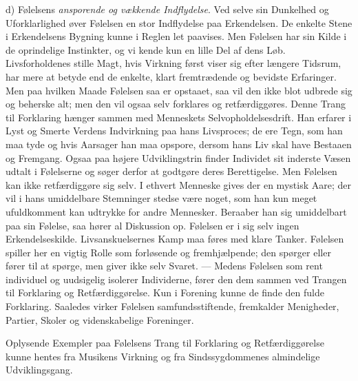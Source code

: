 \documentclass[12pt,a4paper,openany]{book}
\newcommand{\opage}[1]{\marginnote{\footnotesize\textit{[#1]}}}
\begin{document}
d) Følelsens \emph{ansporende og vækkende Indflydelse}. Ved selve sin
Dunkelhed og Uforklarlighed øver Følelsen en stor Indflydelse paa
Erkendelsen. De enkelte Stene i Erkendelsens Bygning kunne i Reglen let
paavises. Men Følelsen har sin Kilde i de oprindelige Instinkter, og vi
kende kun en lille Del af dens Løb. Livsforholdenes stille Magt, hvis
Virkning først viser sig efter længere Tidsrum, har mere at betyde end
de enkelte, klart fremtrædende og bevidste Erfaringer. Men paa hvilken
Maade Følelsen saa er opstaaet, saa vil den ikke blot udbrede sig og
beherske alt;
\opage{361}men den vil ogsaa selv forklares og retfærdiggøres. Denne
Trang til Forklaring hænger sammen med Menneskets Selvopholdelsesdrift.
Han erfarer i Lyst og Smerte Verdens Indvirkning paa hans Livsproces; de
ere Tegn, som han maa tyde og hvis Aarsager han maa opspore, dersom hans
Liv skal have Bestaaen og Fremgang. Ogsaa paa højere Udviklingstrin
finder Individet sit inderste Væsen udtalt i Følelserne og søger derfor
at godtgøre deres Berettigelse. Men Følelsen kan ikke retfærdiggøre sig
selv. I ethvert Menneske gives der en mystisk Aare; der vil i hans
umiddelbare Stemninger stedse være noget, som han kun meget ufuldkomment
kan udtrykke for andre Mennesker. Beraaber han sig umiddelbart paa sin
Følelse, saa hører al Diskussion op. Følelsen er i sig selv ingen
Erkendelseskilde. Livsanskuelsernes Kamp maa føres med klare Tanker.
Følelsen spiller her en vigtig Rolle som forløsende og fremhjælpende;
den spørger eller fører til at spørge, men giver ikke selv Svaret. ---
Medens Følelsen som rent individuel og uudsigelig isolerer Individerne,
fører den dem sammen ved Trangen til Forklaring og Retfærdiggørelse. Kun
i Forening kunne de finde den fulde Forklaring. Saaledes virker Følelsen
samfundsstiftende, fremkalder Menigheder, Partier, Skoler og
videnskabelige Foreninger.

Oplysende Exempler paa Følelsens Trang til Forklaring og
Retfærdiggørelse kunne hentes fra Musikens Virkning og fra
Sindssygdommenes almindelige Udviklingsgang.
\end{document}
